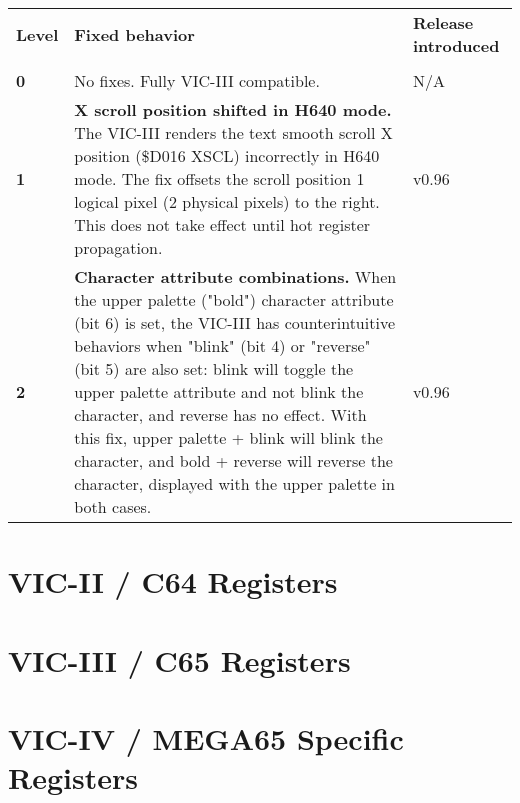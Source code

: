 \begin{longtable}{|p{2cm}|p{7.1cm}|p{2cm}|}
\hhline{---}
{\bf{Level}} & {\bf{Fixed behavior}} & {\bf{Release introduced}} \\
\hhline{---}
\endhead
\multicolumn{3}{l@{}}{continued \ldots}\\
\endfoot
\hline
\endlastfoot

{\bf{0}} & No fixes. Fully VIC-III compatible. & N/A \\

\hline
{\bf{1}} & {\bf{X scroll position shifted in H640 mode.}} The VIC-III renders the text smooth scroll X position (\$D016 XSCL) incorrectly in H640 mode. The fix offsets the scroll position 1 logical pixel (2 physical pixels) to the right. This does not take effect until hot register propagation. &
v0.96 \\

\hline
{\bf{2}} & {\bf{Character attribute combinations.}} When the upper palette ("bold") character attribute (bit 6) is set, the VIC-III has counterintuitive behaviors when "blink" (bit 4) or "reverse" (bit 5) are also set: blink will toggle the upper palette attribute and not blink the character, and reverse has no effect. With this fix, upper palette + blink will blink the character, and bold + reverse will reverse the character, displayed with the upper palette in both cases. &
v0.96 \\

\end{longtable}


\section{VIC-II / C64 Registers}



\section{VIC-III / C65 Registers}



\section{VIC-IV / MEGA65 Specific Registers}


